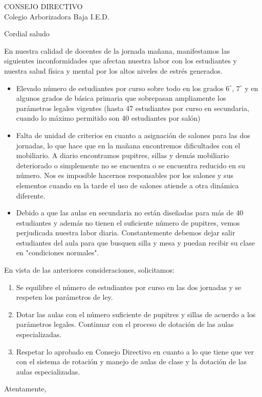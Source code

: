 \documentclass[letterpaper,spanish,11pt]{letter}
\begin{document}
\begin{letter}{CONSEJO DIRECTIVO\\Colegio Arborizadora Baja I.E.D.}
	
\opening{Cordial saludo}
En nuestra calidad de docentes de la jornada mañana, manifestamos las siguientes inconformidades que afectan nuestra labor con los estudiantes y nuestra salud física y mental por los altos niveles de estr\'{e}s generados.
\begin{itemize}
\item Elevado n\'{u}mero de estudiantes por curso sobre todo en los grados $6^{\circ}$, $7^{\circ}$ y en algunos grados de básica primaria que sobrepasan ampliamente los par\'{a}metros legales vigentes (hasta 47 estudiantes por curso en secundaria, cuando lo m\'{a}ximo permitido son 40 estudiantes por sal\'{o}n)
\item Falta de unidad de criterios en cuanto a asignación de salones para las dos jornadas, lo que hace que en la mañana encontremos dificultades con el mobiliario. A diario encontramos pupitres, sillas y demás mobiliario deteriorado o simplemente no se encuentra o se encuentra reducido en su número. Nos es imposible hacernos responsables por los salones y sus elementos cuando en la tarde el uso de salones atiende a otra dinámica diferente.
\item Debido a que las aulas en secundaria no están diseñadas para más de 40 estudiantes y además no tienen el suficiente número de pupitres, vemos perjudicada nuestra labor diaria. Constantemente debemos dejar salir estudiantes del aula para que busquen silla y mesa y puedan recibir su clase en "condiciones normales".
\end{itemize}
En vista de las anteriores consideraciones, solicitamos: 
\begin{enumerate}
\item Se equilibre el número de estudiantes por curso en las dos jornadas y se respeten los parámetros de ley.
\item Dotar las aulas con el número suficiente de pupitres y sillas de acuerdo a los parámetros legales. Continuar con el proceso de dotación de las aulas especializadas.
\item Respetar lo aprobado en Consejo Directivo en cuanto a lo que tiene que ver con el sistema de rotación y manejo de aulas de clase y la dotación de las aulas especializadas.
\end{enumerate}

\closing{Atentamente,}


\end{letter}
\end{document}
